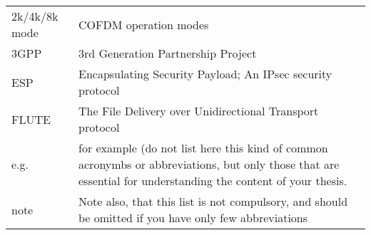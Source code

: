 \documentclass[12pt,a4paper,oneside,pdftex]{report}
\begin{document}

\noindent
\begin{longtable}{@{}p{}p{}@{}}
2k/4k/8k mode & COFDM operation modes \\
3GPP & 3rd Generation Partnership Project \\
ESP & Encapsulating Security Payload; An IPsec security protocol \\
FLUTE  & The File Delivery over Unidirectional Transport protocol \\
e.g.& for example (do not list here this kind of common acronymbs or abbreviations, but only those that are essential for understanding the content of your thesis. \\
note & Note also, that this list is not compulsory, and should be omitted if you have only few abbreviations

\end{longtable}


\cleardoublepage
\tableofcontents



\label{pages-prelude}
\cleardoublepage

\startfirstchapter

\pagestyle{headings}
\end{document}
